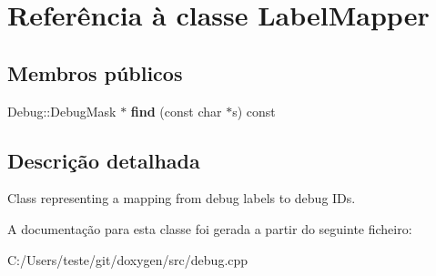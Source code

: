\hypertarget{class_label_mapper}{\section{Referência à classe Label\-Mapper}
\label{class_label_mapper}
}
\subsection*{Membros públicos}
\begin{DoxyCompactItemize}
\item 
\hypertarget{class_label_mapper_ae86036d7a6584ee436443e93daaa941e}{Debug\-::\-Debug\-Mask $\ast$ {\bfseries find} (const char $\ast$s) const }\label{class_label_mapper_ae86036d7a6584ee436443e93daaa941e}

\end{DoxyCompactItemize}


\subsection{Descrição detalhada}
Class representing a mapping from debug labels to debug I\-Ds. 

A documentação para esta classe foi gerada a partir do seguinte ficheiro\-:\begin{DoxyCompactItemize}
\item 
C\-:/\-Users/teste/git/doxygen/src/debug.\-cpp\end{DoxyCompactItemize}
